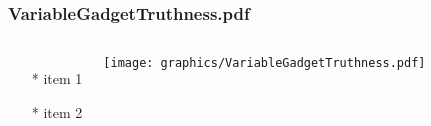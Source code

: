 \documentclass{beamer}
\begin{document}
\begin{frame} \frametitle{VariableGadgetTruthness.pdf}
    \begin{columns}[c]
        \begin{itemize}
            \item[*] item 1
            \item[*] item 2
        \end{itemize}
        \begin{minipage}{\linewidth}
            \begin{center}
            \texttt{[image: graphics/VariableGadgetTruthness.pdf]}
            \label{gfx:VariableGadgetTruthness.pdf}
            \end{center}
        \end{minipage}
    \end{columns}
\end{frame}


\end{document}
